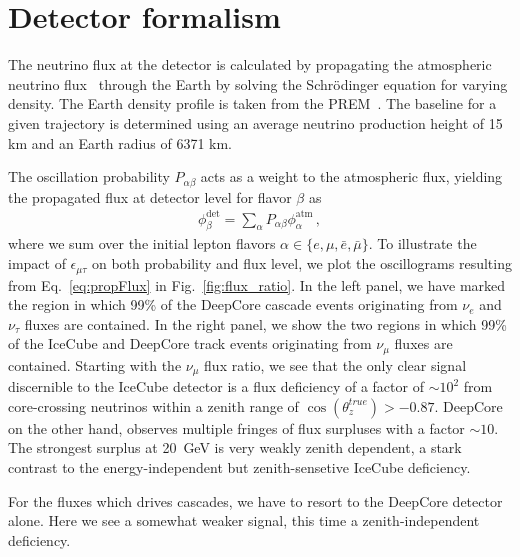 \documentclass[draft=True]{revtex4-2}
\newcommand{\ztrue}{\ensuremath{\cos{(\theta_z^{true})}}}
\newcommand{\emt}{\ensuremath{\epsilon_{\mu\tau}}}
\renewcommand{\ne}{\nu_e}
\newcommand{\nm}{\nu_\mu}
\newcommand{\nt}{\nu_\tau}
\begin{document}
\section{Detector formalism}
The neutrino flux at the detector is calculated by propagating the atmospheric neutrino flux~\cite{hondapaper} through the Earth by solving the 
Schrödinger equation for varying density. The Earth density profile is taken from the PREM~\cite{PREM}. The baseline for a given trajectory is determined using an average neutrino
production height of 15 km and an Earth radius of 6371 km. %


The oscillation probability $P_{\alpha \beta}$ acts as a weight to the atmospheric flux, yielding the propagated flux at detector level for flavor $\beta$ as 
\begin{align}\label{eq:propFlux}
    \phi_\beta^\text{det} = \sum_\alpha P_{\alpha\beta} \phi_\alpha^\text{atm} \,,
\end{align}
where we sum over the initial lepton flavors $\alpha \in \{e,\mu, \bar{e}, \bar{\mu}\}$. To illustrate the impact of $\emt$ on both probability
and flux level, we plot the oscillograms resulting from Eq.~\ref{eq:propFlux} in Fig.~\ref{fig:flux_ratio}. In the left panel, we have marked the region in which 99\% of the 
DeepCore cascade events originating from $\ne$ and $\nt$ fluxes are contained. In the right panel, we show the two regions in which 99\% of the IceCube 
and DeepCore track events originating from $\nm$ fluxes are contained. Starting with the $\nm$ flux ratio, we see that the only clear signal discernible to the IceCube detector
is a flux deficiency of a factor of $\sim 10^2$ from core-crossing neutrinos within a zenith range of $\ztrue > -0.87$. DeepCore on the other hand, 
observes multiple fringes of flux surpluses with a factor $\sim 10$. The strongest surplus at \SI{20}{\GeV} is very weakly zenith dependent, a stark contrast to the
energy-independent but zenith-sensetive IceCube deficiency.

For the fluxes which drives cascades, we have to resort to the DeepCore detector alone. %
Here we see a somewhat weaker signal, this time a zenith-independent deficiency. 
\end{document}
